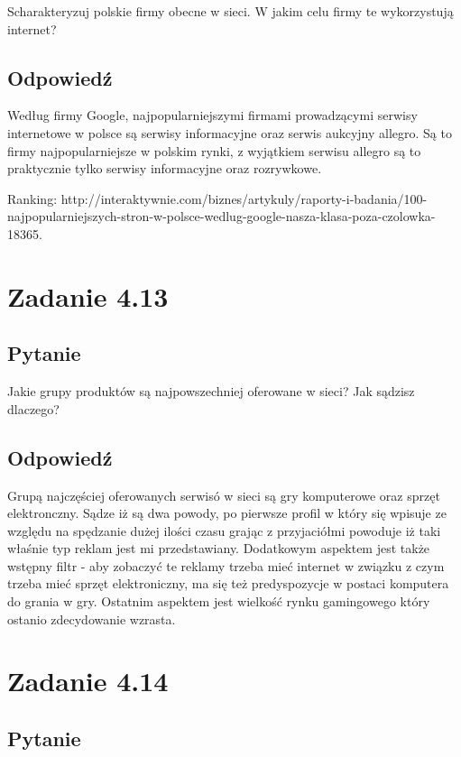 \documentclass[paper=a4, fontsize=11pt]{scrartcl} %
\numberwithin{equation}{section} %
\numberwithin{figure}{section} %
\numberwithin{table}{section} %
\begin{document}
Scharakteryzuj polskie firmy obecne w sieci. W jakim celu firmy te wykorzystują internet?

\subsection {Odpowiedź}

Według firmy Google, najpopularniejszymi firmami prowadzącymi serwisy internetowe w polsce są serwisy informacyjne
oraz serwis aukcyjny allegro. Są to firmy najpopularniejsze w polskim rynki, z wyjątkiem serwisu allegro są to praktycznie
tylko serwisy informacyjne oraz rozrywkowe.

Ranking: http://interaktywnie.com/biznes/artykuly/raporty-i-badania/100-najpopularniejszych-stron-w-polsce-wedlug-google-nasza-klasa-poza-czolowka-18365.

\section{Zadanie 4.13}

\subsection {Pytanie}

Jakie grupy produktów są najpowszechniej oferowane w sieci? Jak sądzisz dlaczego?

\subsection {Odpowiedź}

Grupą najczęściej oferowanych serwisó w sieci są gry komputerowe oraz sprzęt elektronczny.
Sądze iż są dwa powody, po pierwsze profil w który się wpisuje ze względu na spędzanie 
dużej ilości czasu grając z przyjaciółmi powoduje iż taki właśnie typ reklam jest mi przedstawiany.
Dodatkowym aspektem jest także wstępny filtr - aby zobaczyć te reklamy trzeba mieć internet w związku
z czym trzeba mieć sprzęt elektroniczny, ma się też predyspozycje w postaci komputera do grania w gry.
Ostatnim aspektem jest wielkość rynku gamingowego który ostanio zdecydowanie wzrasta.

\section{Zadanie 4.14}

\subsection {Pytanie}
\end{document}
